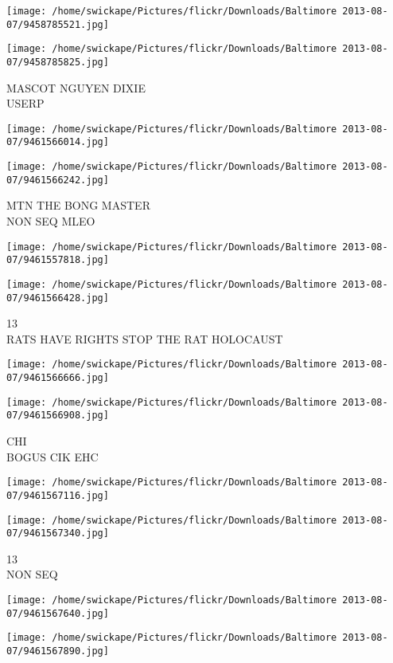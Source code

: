 \documentclass[10pt,letterpaper]{article}
\begin{document}
\texttt{[image: /home/swickape/Pictures/flickr/Downloads/Baltimore 2013-08-07/9458785521.jpg]}

\vspace{0.25in}
\texttt{[image: /home/swickape/Pictures/flickr/Downloads/Baltimore 2013-08-07/9458785825.jpg]}

MASCOT NGUYEN DIXIE\\
USERP
\pagebreak

\texttt{[image: /home/swickape/Pictures/flickr/Downloads/Baltimore 2013-08-07/9461566014.jpg]}

\vspace{0.25in}
\texttt{[image: /home/swickape/Pictures/flickr/Downloads/Baltimore 2013-08-07/9461566242.jpg]}

MTN THE BONG MASTER\\
NON SEQ MLEO
\pagebreak

\texttt{[image: /home/swickape/Pictures/flickr/Downloads/Baltimore 2013-08-07/9461557818.jpg]}

\vspace{0.25in}
\texttt{[image: /home/swickape/Pictures/flickr/Downloads/Baltimore 2013-08-07/9461566428.jpg]}

13\\
RATS HAVE RIGHTS STOP THE RAT HOLOCAUST
\pagebreak

\texttt{[image: /home/swickape/Pictures/flickr/Downloads/Baltimore 2013-08-07/9461566666.jpg]}

\vspace{0.25in}
\texttt{[image: /home/swickape/Pictures/flickr/Downloads/Baltimore 2013-08-07/9461566908.jpg]}

CHI\\
BOGUS CIK EHC
\pagebreak

\texttt{[image: /home/swickape/Pictures/flickr/Downloads/Baltimore 2013-08-07/9461567116.jpg]}

\vspace{0.25in}
\texttt{[image: /home/swickape/Pictures/flickr/Downloads/Baltimore 2013-08-07/9461567340.jpg]}

13\\
NON SEQ
\pagebreak

\texttt{[image: /home/swickape/Pictures/flickr/Downloads/Baltimore 2013-08-07/9461567640.jpg]}

\vspace{0.25in}
\texttt{[image: /home/swickape/Pictures/flickr/Downloads/Baltimore 2013-08-07/9461567890.jpg]}
\end{document}
